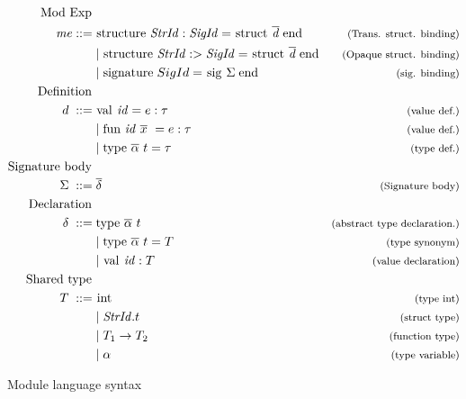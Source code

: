 \begin{figure}[!htb]
\newcommand{\ova}{\overline{\alpha}}
\begin{align*}
\begin{aligned}
%
\text{Mod Exp }\\
\mathit{me} ::= \; & \text{\lsttext{structure}} \;  \mathit{StrId : SigId} = \text{\lsttext{struct}}\; \overline{\mathit{d}}\; \text{\lsttext{end}}
                                             & \expl{(Trans. struct. binding)}\\
&|\; \text{\lsttext{structure}} \;  \mathit{StrId :> SigId} = 
\text{\lsttext{struct}}\; \overline{\mathit{d}}\; \text{\lsttext{end}}
                                             & \expl{(Opaque struct. binding)}\\
&|\; \text{\lsttext{signature}} \; SigId = 
\text{\lsttext{sig}}\; \Sigma \; \text{\lsttext{end}} 
                                             & \expl{(sig. binding)}\\
%
\text{Definition }\\
d \; ::= \; &\text{\lsttext{val}}\ \mathit{id}=e:\tau   & \expl{(value def.)} \\
& |\; \text{\lsttext{fun}}\  \mathit{id}\ \overline{x}\ =e:\tau   & \expl{(value def.)} \\
& |\; \text{\lsttext{type}}\ \ova\ t= \tau           & \expl{(type def.)} \\
%
\text{Signature body } \\
\Sigma \; ::= \; &\overline{\delta}                    & \expl{(Signature body)}\\
%
\text{Declaration }\\
\delta \; ::= \; & \text{\lsttext{type}}\ \ova\ t  & \expl{(abstract type declaration.)} \\
& | \; \text{\lsttext{type}}\ \ova\ t = T          & \expl{(type synonym)} \\
& | \; \text{\lsttext{val}}\ \mathit{id}:T         & \expl{(value declaration)} \\
%
\text{Shared type } \\
T \; ::= \; &\text{\lsttext{int}}                  & \expl{(type int)} \\
&| \; \mathit{StrId}.t                             & \expl{(struct type)}\\
&| \; T_{1} \rightarrow T_{2}                      & \expl{(function type)}\\
&| \; \alpha                                       & \expl{(type variable)}
\end{aligned}
\end{align*}
\caption{Module language syntax \label{fig:ModuleSyntax}}
\label{fig:Syntax}
\end{figure}
